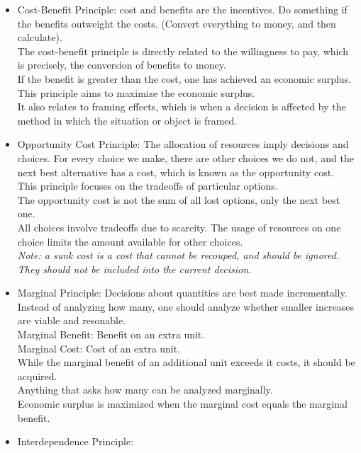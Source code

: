 \documentclass[nobib]{tufte-handout}
\begin{document}
\begin{itemize}
    \item Cost-Benefit Principle: cost and benefits are the incentives. Do something if
          the benefits outweight the costs. (Convert everything to money, and then
          calculate).\\ The cost-benefit principle is directly related to the willingness
          to pay, which is precisely, the conversion of benefits to money.\\ If the
          benefit is greater than the cost, one has achieved an economic surplus. This
          principle aims to maximize the economic surplus.\\ It also relates to framing
          effects, which is when a decision is affected by the method in which the
          situation or object is framed.
    \item Opportunity Cost Principle: The allocation of resources imply decisions and
          choices. For every choice we make, there are other choices we do not, and the
          next best alternative has a cost, which is known as the opportunity cost. \\
          This principle focuses on the tradeoffs of particular options.\\ The
          opportunity cost is not the sum of all lost options, only the next best one.\\
          All choices involve tradeoffs due to scarcity. The usage of resources on one
          choice limits the amount available for other choices.\\ \textit{Note: a sunk
              cost is a cost that cannot be recouped, and should be ignored. They should not
              be included into the current decision.}\\
    \item Marginal Principle: Decisions about quantities are best made incrementally.
          Instead of analyzing how many, one should analyze whether smaller increases are
          viable and resonable.\\ \quad Marginal Benefit: Benefit on an extra unit.\\
          \quad Marginal Cost: Cost of an extra unit.\\ While the marginal benefit of an
          additional unit exceeds it costs, it should be acquired.\\ Anything that asks
          how many can be analyzed marginally.\\ Economic surplus is maximized when the
          marginal cost equals the marginal benefit.
    \item Interdependence Principle:
\end{itemize}
\end{document}

